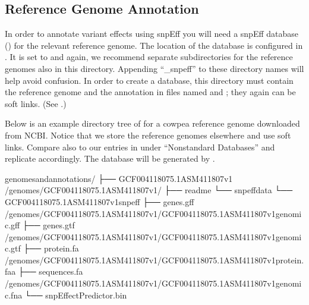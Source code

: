 \documentclass[letterpaper,10pt,english]{sphinxhowto}
\begin{document}
\subsection{Reference Genome Annotation}
\label{\detokenize{index:reference-genome-annotation}}
In order to annotate variant effects using snpEff you will need a snpEff database () for the relevant reference genome. The location of the  database is configured in . It is set to  and again, we recommend separate subdirectories for the reference genomes also in this directory. Appending “\_snpeff” to these directory names will help avoid confusion. In order to create a  database, this  directory must contain the reference genome and the annotation in files named  and ; they again can be soft links. (See .)

Below is an example directory tree of  for a cowpea reference genome downloaded from NCBI. Notice that we store the reference genomes elsewhere and use soft links. Compare also to our entries in  under “Non\sphinxhyphen{}standard Databases” and replicate accordingly. The database  will be generated by .

\begin{sphinxVerbatim}[commandchars=\\\{\}]
genomes\PYGZus{}and\PYGZus{}annotations/
├── GCF\PYGZus{}004118075.1\PYGZus{}ASM411807v1 \PYGZhy{}\PYGZgt{} \PYGZti{}/genomes/GCF\PYGZus{}004118075.1\PYGZus{}ASM411807v1/
├── readme
└── snpeffdata
    └── GCF\PYGZus{}004118075.1\PYGZus{}ASM411807v1\PYGZus{}snpeff
        ├── genes.gff \PYGZhy{}\PYGZgt{} \PYGZti{}/genomes/GCF\PYGZus{}004118075.1\PYGZus{}ASM411807v1/GCF\PYGZus{}004118075.1\PYGZus{}ASM411807v1\PYGZus{}genomic.gff
        ├── genes.gtf \PYGZhy{}\PYGZgt{} \PYGZti{}/genomes/GCF\PYGZus{}004118075.1\PYGZus{}ASM411807v1/GCF\PYGZus{}004118075.1\PYGZus{}ASM411807v1\PYGZus{}genomic.gtf
        ├── protein.fa \PYGZhy{}\PYGZgt{} \PYGZti{}/genomes/GCF\PYGZus{}004118075.1\PYGZus{}ASM411807v1/GCF\PYGZus{}004118075.1\PYGZus{}ASM411807v1\PYGZus{}protein.faa
        ├── sequences.fa \PYGZhy{}\PYGZgt{} \PYGZti{}/genomes/GCF\PYGZus{}004118075.1\PYGZus{}ASM411807v1/GCF\PYGZus{}004118075.1\PYGZus{}ASM411807v1\PYGZus{}genomic.fna
        └── snpEffectPredictor.bin
\end{sphinxVerbatim}
\end{document}
